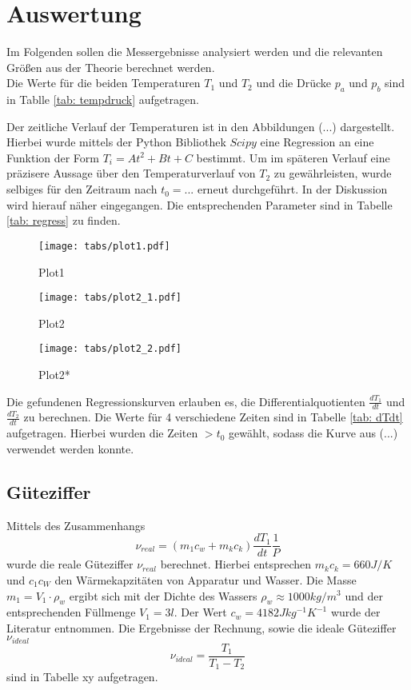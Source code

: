 \section{Auswertung}
Im Folgenden sollen die Messergebnisse analysiert werden und die relevanten Größen aus der Theorie berechnet werden. \\
Die Werte für die beiden Temperaturen $T_1$ und $T_2$ und die Drücke $p_a$ und $p_b$ sind in Tablle \ref{tab: tempdruck} aufgetragen.

Der zeitliche Verlauf der Temperaturen ist in den Abbildungen (...) dargestellt. Hierbei wurde mittels der Python Bibliothek $Scipy$ eine
Regression an eine Funktion der Form $T_i = A t^2 + B t + C$ bestimmt. Um im späteren Verlauf eine präzisere Aussage über den Temperaturverlauf
von $T_2$ zu gewährleisten, wurde selbiges für den Zeitraum nach $t_0 = ...$ erneut durchgeführt. In der Diskussion wird hierauf näher eingegangen. Die entsprechenden
Parameter sind in Tabelle \ref{tab: regress} zu finden. \\
\begin{figure}[h]
  \centering
  \texttt{[image: tabs/plot1.pdf]}
  \caption{Plot1}
  \label{fig: Plot1}
\end{figure}

\begin{figure}[h]
  \centering
  \texttt{[image: tabs/plot2\_1.pdf]}
  \caption{Plot2}
  \label{fig: Plot2}
\end{figure}

\begin{figure}[h]
  \centering
  \texttt{[image: tabs/plot2\_2.pdf]}
  \caption{Plot2*}
  \label{fig: Plot2*}
\end{figure}


Die gefundenen Regressionskurven erlauben es, die Differentialquotienten $\frac{dT_1}{dt}$ und $\frac{dT_2}{dt}$ zu berechnen. Die Werte für 4 verschiedene Zeiten sind
in Tabelle \ref{tab: dTdt} aufgetragen. Hierbei wurden die Zeiten $> t_0$ gewählt, sodass die Kurve aus (...) verwendet werden konnte.

\subsection{Güteziffer}

Mittels des Zusammenhangs
\begin{equation}
  \nu_{real} = (m_1 c_w + m_k c_k) \frac{dT_1}{dt} \frac{1}{P}
\end{equation}
wurde die reale Güteziffer $\nu_{real}$ berechnet. Hierbei entsprechen $m_k c_k = 660 J/K$ und $c_1 c_W$ den Wärmekapzitäten von Apparatur und Wasser. Die Masse $m_1 = V_1 \cdot \rho_w$ ergibt sich mit
der Dichte des Wassers $\rho_w \approx 1000 kg/m^3$ und der entsprechenden Füllmenge $V_1 = 3 l$. Der Wert $c_w = 4182 Jkg^{-1}K^{-1}$ wurde der Literatur entnommen. Die Ergebnisse
der Rechnung, sowie die ideale Güteziffer $\nu_{ideal}$
\begin{equation}
  \nu_{ideal} = \frac{T_1}{T_1 - T_2}
\end{equation}
sind in Tabelle xy aufgetragen.


